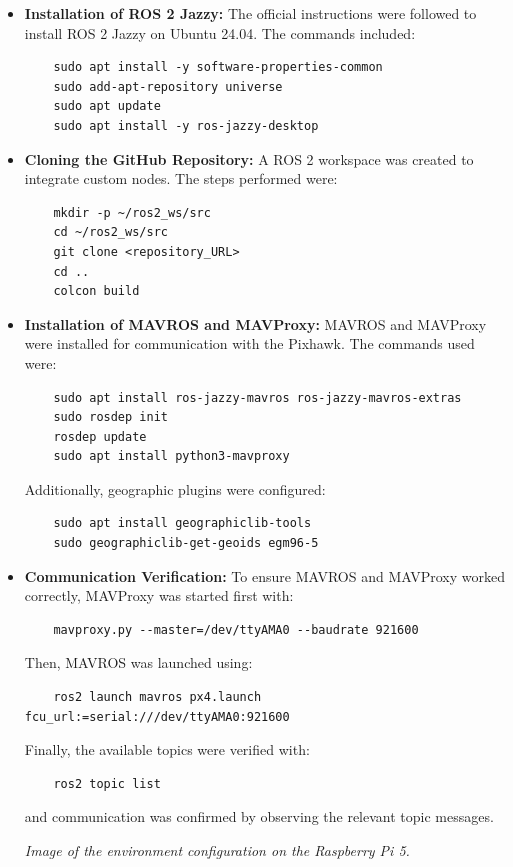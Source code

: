 \begin{itemize}
    \item \textbf{Installation of ROS 2 Jazzy:} 
    The official instructions were followed to install ROS 2 Jazzy on Ubuntu 24.04. The commands included:
    \begin{verbatim}
    sudo apt install -y software-properties-common
    sudo add-apt-repository universe
    sudo apt update
    sudo apt install -y ros-jazzy-desktop
    \end{verbatim}
    
    \item \textbf{Cloning the GitHub Repository:} 
    A ROS 2 workspace was created to integrate custom nodes. The steps performed were:
    \begin{verbatim}
    mkdir -p ~/ros2_ws/src
    cd ~/ros2_ws/src
    git clone <repository_URL>
    cd ..
    colcon build
    \end{verbatim}
    
    \item \textbf{Installation of MAVROS and MAVProxy:} 
    MAVROS and MAVProxy were installed for communication with the Pixhawk. The commands used were:
    \begin{verbatim}
    sudo apt install ros-jazzy-mavros ros-jazzy-mavros-extras
    sudo rosdep init
    rosdep update
    sudo apt install python3-mavproxy
    \end{verbatim}
    Additionally, geographic plugins were configured:
    \begin{verbatim}
    sudo apt install geographiclib-tools
    sudo geographiclib-get-geoids egm96-5
    \end{verbatim}
    
    \item \textbf{Communication Verification:} 
    To ensure MAVROS and MAVProxy worked correctly, MAVProxy was started first with:
    \begin{verbatim}
    mavproxy.py --master=/dev/ttyAMA0 --baudrate 921600
    \end{verbatim}
    Then, MAVROS was launched using:
    \begin{verbatim}
    ros2 launch mavros px4.launch fcu_url:=serial:///dev/ttyAMA0:921600
    \end{verbatim}
    Finally, the available topics were verified with:
    \begin{verbatim}
    ros2 topic list
    \end{verbatim}
    and communication was confirmed by observing the relevant topic messages.
    
    \begin{center} 
        \textit{Image of the environment configuration on the Raspberry Pi 5.} 
    \end{center}
\end{itemize}
    
